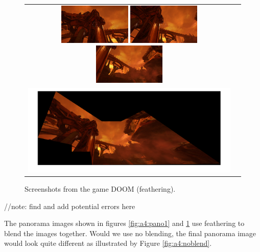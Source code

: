 \begin{figure}[h]
	\centering
	\begin{tabular}{cc}
	\includegraphics[width=0.33\textwidth]{figures/doom1.jpg}
	\includegraphics[width=0.33\textwidth]{figures/doom2.jpg}
	\includegraphics[width=0.33\textwidth]{figures/doom3.jpg} \\
	\includegraphics[width=1\textwidth]{figures/doom_p.png}
	
	\end{tabular}
	\caption{Screenshots from the game DOOM (feathering).}
	\label{fig:a4:pano2}
\end{figure}

//note: find and add potential errors here

The panorama images shown in figures \ref{fig:a4:pano1} and \ref{fig:a4:pano2} use feathering to blend the images together. Would we use no blending, the final panorama image would look quite different as illustrated by Figure \ref{fig:a4:noblend}.

